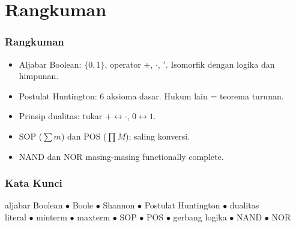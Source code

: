 \documentclass[handout]{beamer}
\theoremstyle{definition}
\theoremstyle{example}
\begin{document}
\section{Rangkuman}

\begin{frame}
\frametitle{Rangkuman}
\begin{itemize}
  \item Aljabar Boolean: $\{0,1\}$, operator $+$, $\cdot$, $'$. Isomorfik dengan logika dan himpunan.
  \item Postulat Huntington: 6 aksioma dasar. Hukum lain = teorema turunan.
  \item Prinsip dualitas: tukar $+ \leftrightarrow \cdot$, $0 \leftrightarrow 1$.
  \item SOP ($\sum m$) dan POS ($\prod M$); saling konversi.
  \item NAND dan NOR masing-masing functionally complete.
\end{itemize}
\end{frame}

\begin{frame}
\frametitle{Kata Kunci}
\begin{center}
\small
aljabar Boolean $\bullet$ Boole $\bullet$ Shannon $\bullet$ Postulat Huntington $\bullet$ dualitas\\
literal $\bullet$ minterm $\bullet$ maxterm $\bullet$ SOP $\bullet$ POS $\bullet$ gerbang logika $\bullet$ NAND $\bullet$ NOR
\end{center}
\end{frame}
\end{document}
